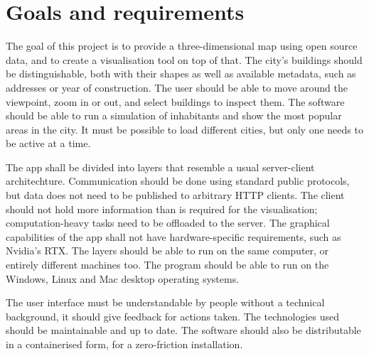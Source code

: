 \chapter{Goals and requirements}

The goal of this project is to provide a three-dimensional map using open source data, and to create a visualisation tool on top of that. The city's buildings should be distinguishable, both with their shapes as well as available metadata, such as addresses or year of construction. The user should be able to move around the viewpoint, zoom in or out, and select buildings to inspect them. The software should be able to run a simulation of inhabitants and show the most popular areas in the city. It must be possible to load different cities, but only one needs to be active at a time.

The app shall be divided into layers that resemble a usual server-client architechture. Communication should be done using standard public protocols, but data does not need to be published to arbitrary HTTP clients. The client should not hold more information than is required for the visualisation; computation-heavy tasks need to be offloaded to the server. The graphical capabilities of the app shall not have hardware-specific requirements, such as Nvidia's RTX. The layers should be able to run on the same computer, or entirely different machines too. The program should be able to run on the Windows, Linux and Mac desktop operating systems.

The user interface must be understandable by people without a technical background, it should give feedback for actions taken. The technologies used should be maintainable and up to date. The software should also be distributable in a containerised form, for a zero-friction installation.